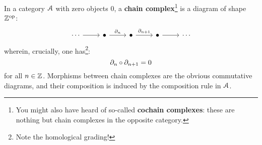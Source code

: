                 \begin{example} \label{example: chain_complexes}
                    In a category $\mathcal{A}$ with zero objects $0$, a \textbf{chain complex}\footnote{You might also have heard of so-called \textbf{cochain complexes}: these are nothing but chain complexes in the opposite category.} is a diagram of shape $\mathbb{Z}^{\mathrm{op}}$:
                        $$
                            \begin{tikzcd}
                            	{\cdots} & \bullet & \bullet & \bullet & {\cdots}
                            	\arrow[from=1-1, to=1-2]
                            	\arrow["{\del_n}", from=1-2, to=1-3]
                            	\arrow["{\del_{n + 1}}", from=1-3, to=1-4]
                            	\arrow[from=1-4, to=1-5]
                            \end{tikzcd}
                        $$
                    wherein, crucially, one has\footnote{Note the homological grading!}:
                        $$\partial_n \circ \partial_{n + 1} = 0$$
                    for all $n \in \mathbb{Z}$. Morphisms between chain complexes are the obvious commutative diagrams, and their composition is induced by the composition rule in $\mathcal{A}$.
                    

\end{example}
